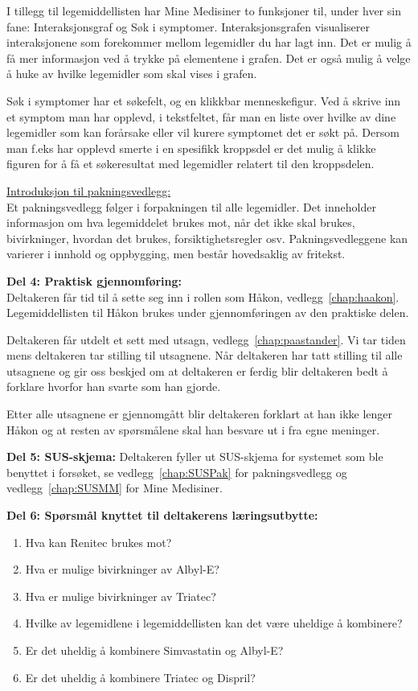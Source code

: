 I tillegg til legemiddellisten har Mine Medisiner to funksjoner til, under hver sin fane: Interaksjonsgraf og Søk i symptomer. Interaksjonsgrafen visualiserer interaksjonene som forekommer mellom legemidler du har lagt inn. Det er mulig å få mer informasjon ved å trykke på elementene i grafen. Det er også mulig å velge å huke av hvilke legemidler som skal vises i grafen. 

Søk i symptomer har et søkefelt, og en klikkbar menneskefigur. Ved å skrive inn et symptom man har opplevd, i tekstfeltet, får man en liste over hvilke av dine legemidler som kan forårsake eller vil kurere symptomet det er søkt på. Dersom man f.eks har opplevd smerte i en spesifikk kroppsdel er det mulig å klikke figuren for å få et søkeresultat med legemidler relatert til den kroppsdelen. 

\underline{Introduksjon til pakningsvedlegg:}\\
Et pakningsvedlegg følger i forpakningen til alle legemidler. Det inneholder informasjon om hva legemiddelet brukes mot, når det ikke skal brukes, bivirkninger, hvordan det brukes, forsiktighetsregler osv. Pakningsvedleggene kan varierer i innhold og oppbygging, men består hovedsaklig av fritekst. 

\textbf{Del 4: Praktisk gjennomføring:}\\
Deltakeren får tid til å sette seg inn i rollen som Håkon, vedlegg~\ref{chap:haakon}. Legemiddellisten til Håkon brukes under gjennomføringen av den praktiske delen. 

Deltakeren får utdelt et sett med utsagn, vedlegg~\ref{chap:paastander}. Vi tar tiden mens deltakeren tar stilling til utsagnene. Når deltakeren har tatt stilling til alle utsagnene og gir oss beskjed om at deltakeren er ferdig blir deltakeren bedt å forklare hvorfor han svarte som han gjorde.

Etter alle utsagnene er gjennomgått blir deltakeren forklart at han ikke lenger Håkon og at resten av spørsmålene skal han besvare ut i fra egne meninger.

\textbf{Del 5: SUS-skjema:}
Deltakeren fyller ut SUS-skjema for systemet som ble benyttet i forsøket, se vedlegg~\ref{chap:SUSPak} for pakningsvedlegg og vedlegg~\ref{chap:SUSMM} for Mine Medisiner.

\textbf{Del 6: Spørsmål knyttet til deltakerens læringsutbytte:}
\begin{enumerate}
\item Hva kan Renitec brukes mot?
\item Hva er mulige bivirkninger av Albyl-E?
\item Hva er mulige bivirkninger av Triatec?
\item Hvilke av legemidlene i legemiddellisten kan det være uheldige å kombinere?
\item Er det uheldig å kombinere Simvastatin og Albyl-E?
\item Er det uheldig å kombinere Triatec og Dispril?
\end{enumerate}


